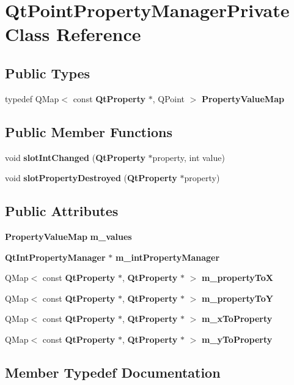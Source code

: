 \section{Qt\+Point\+Property\+Manager\+Private Class Reference}
\label{classQtPointPropertyManagerPrivate}
\subsection*{Public Types}
\begin{DoxyCompactItemize}
\item 
typedef Q\+Map$<$ const {\bf Qt\+Property} $\ast$, Q\+Point $>$ {\bf Property\+Value\+Map}
\end{DoxyCompactItemize}
\subsection*{Public Member Functions}
\begin{DoxyCompactItemize}
\item 
void {\bf slot\+Int\+Changed} ({\bf Qt\+Property} $\ast$property, int value)
\item 
void {\bf slot\+Property\+Destroyed} ({\bf Qt\+Property} $\ast$property)
\end{DoxyCompactItemize}
\subsection*{Public Attributes}
\begin{DoxyCompactItemize}
\item 
{\bf Property\+Value\+Map} {\bf m\+\_\+values}
\item 
{\bf Qt\+Int\+Property\+Manager} $\ast$ {\bf m\+\_\+int\+Property\+Manager}
\item 
Q\+Map$<$ const {\bf Qt\+Property} $\ast$, {\bf Qt\+Property} $\ast$ $>$ {\bf m\+\_\+property\+ToX}
\item 
Q\+Map$<$ const {\bf Qt\+Property} $\ast$, {\bf Qt\+Property} $\ast$ $>$ {\bf m\+\_\+property\+ToY}
\item 
Q\+Map$<$ const {\bf Qt\+Property} $\ast$, {\bf Qt\+Property} $\ast$ $>$ {\bf m\+\_\+x\+To\+Property}
\item 
Q\+Map$<$ const {\bf Qt\+Property} $\ast$, {\bf Qt\+Property} $\ast$ $>$ {\bf m\+\_\+y\+To\+Property}
\end{DoxyCompactItemize}


\subsection{Member Typedef Documentation}
